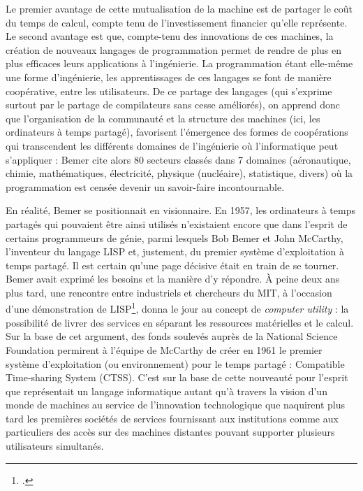 \documentclass{FramateX}
\begin{document}
\begin{refsection}
Le premier
avantage de cette mutualisation de la machine est de partager le coût
du temps de calcul, compte tenu de l'investissement financier qu'elle
représente. Le second avantage est que, compte-tenu des innovations de
ces machines, la création de nouveaux langages de programmation permet
de rendre de plus en plus efficaces leurs applications à l'ingénierie.
La programmation étant elle-même une forme d'ingénierie, les
apprentissages de ces langages se font de manière coopérative, entre
les utilisateurs. De ce partage des langages (qui s'exprime surtout par
le partage de compilateurs sans cesse améliorés), on apprend donc que
l'organisation de la communauté et la structure des machines (ici, les
ordinateurs à temps partagé), favorisent l'émergence des formes de
coopérations qui transcendent les différents domaines de l'ingénierie
où l'informatique peut s'appliquer : Bemer cite alors 80 secteurs
classés dans 7 domaines (aéronautique, chimie, mathématiques,
électricité, physique (nucléaire), statistique, divers) où la
programmation est censée devenir un savoir-faire incontournable.

En réalité, Bemer se positionnait en visionnaire. En 1957, les
ordinateurs à temps partagés qui pouvaient être ainsi utilisés
n'existaient encore que dans l'esprit de certains programmeurs de
génie, parmi lesquels Bob Bemer et John McCarthy, l'inventeur du
langage LISP et, justement, du premier système d'exploitation à temps
partagé. Il est certain qu'une page décisive était en train de se
tourner. Bemer avait exprimé les besoins et la manière d'y répondre. À
peine deux ans plus tard, une rencontre entre industriels et chercheurs
du MIT, à l'occasion d'une démonstration de LISP\footnote{\cite{mccarthyhistory1978}.}, donna le jour au concept de \textit{computer utility} : la
possibilité de livrer des services en séparant les ressources
matérielles et le calcul. Sur la base de cet argument, des fonds
soulevés auprès de la National Science Foundation permirent à l'équipe
de McCarthy de créer en 1961 le premier système d'exploitation (ou
environnement) pour le temps partagé : Compatible Time-sharing System
(CTSS). C'est sur la base de cette nouveauté pour
l'esprit que représentait un langage informatique
autant qu'à travers la vision d'un
monde de machines au service de l'innovation
technologique que naquirent plus tard les premières sociétés de
services fournissant aux institutions comme aux particuliers des accès
sur des machines distantes pouvant supporter plusieurs utilisateurs
simultanés. 


\end{refsection}
\end{document}
